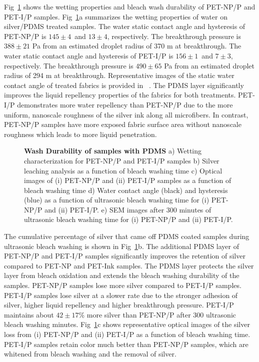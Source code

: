 \documentclass[10pt,letterpaper]{article}
\begin{document}
Fig~\ref{fig4} shows the wetting properties and bleach wash durability of PET-NP/P and PET-I/P samples. 
Fig~\ref{fig4}a summarizes the wetting properties of water on silver/PDMS treated samples. 
The water static contact angle and hysteresis of PET-NP/P is $145 \pm 4$\degree~and $13 \pm 4$\degree, respectively. 
The breakthrough pressure is $388 \pm 21$ Pa from an estimated droplet radius of 370 \micro m at breakthrough. 
The water static contact angle and hysteresis of PET-I/P is $156 \pm 1$\degree~and $7 \pm 3$\degree, respectively. The breakthrough pressure is $490 \pm 65$ Pa from an estimated droplet radius of 294 \micro m at breakthrough. 
Representative images of the static water contact angle of treated fabrics is provided in ~. %
The PDMS layer significantly improves the liquid repellency properties of the fabrics for both treatments. 
PET-I/P demonstrates more water repellency than PET-NP/P due to the more uniform, nanoscale roughness of the silver ink along all microfibers. 
In contrast, 
PET-NP/P %
samples 
have more exposed fabric surface area without nanoscale roughness which leads to more liquid penetration. 

\begin{figure}[!h]
\caption{{\bf Wash Durability of samples with PDMS}{
a) Wetting characterization for PET-NP/P and PET-I/P samples b) Silver leaching analysis as a function of bleach washing time c) Optical images of (i) PET-NP/P and (ii) PET-I/P samples as a function of bleach washing time d) Water contact angle (black) and hysteresis (blue) as a function of ultrasonic bleach washing time for (i) PET-NP/P and (ii) PET-I/P. e) SEM images after 300 minutes of ultrasonic bleach washing time for (i) PET-NP/P and (ii) PET-I/P.}}
\label{fig4}
\end{figure}

The cumulative percentage of silver that came off PDMS coated samples during ultrasonic bleach washing is shown in Fig~\ref{fig4}b. The additional PDMS layer of PET-NP/P and PET-I/P samples significantly improves the retention of silver compared to PET-NP and PET-Ink samples. The PDMS layer protects the silver layer from bleach oxidation and extends the bleach washing durability of the samples. PET-NP/P samples lose more silver compared to PET-I/P samples. PET-I/P samples lose silver at a slower rate due to the stronger adhesion of silver, higher liquid repellency and higher breakthrough pressure. PET-I/P maintains about $42 \pm 17$\% more silver than PET-NP/P after 300 ultrasonic bleach washing minutes. 
Fig~\ref{fig4}c shows representative optical images of the silver loss from (i) PET-NP/P and (ii) PET-I/P as a function of bleach washing time.  
PET-I/P samples retain color much better than PET-NP/P samples, which are whitened from bleach washing and the removal of silver.  
\end{document}
